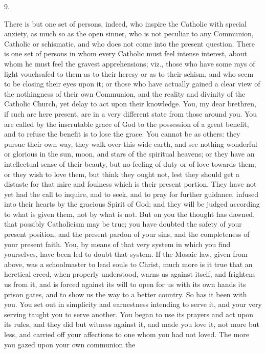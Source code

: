 9.

There is but one set of persons, indeed, who inspire the Catholic
with special anxiety, as much so as the open sinner, who is not
peculiar to any Communion, Catholic or schismatic, and who does not
come into the present question. There is one set of persons in whom
every Catholic must feel intense interest, about whom he must feel the
gravest apprehensions; viz., those who have some rays of light
vouchsafed to them as to their heresy or as to their schism, and who
seem to be closing their eyes upon it; or those who have actually
gained a clear view of the nothingness of their own Communion, and the
reality and divinity of the Catholic Church, yet delay to act upon
their knowledge. You, my dear brethren, if such are here present, are
in a very different state from those around you. You are called by the
inscrutable grace of God to the possession of a great benefit, and to
refuse the benefit is to lose the grace. You cannot be as others: they
pursue their own way, they walk over this wide earth, and see nothing
wonderful or glorious in the sun, moon, and stars of the spiritual
heavens; or they have an intellectual sense of their beauty, but no
feeling of duty or of love towards them; or they wish to love them,
but think they ought not, lest they should get a distaste for that
mire and foulness which is their present portion. They have not yet
had the call to inquire, and to seek, and to pray for further
guidance, infused into their hearts by the gracious Spirit of God; and
they will be judged according to what is given them, not by what is
not. But on you the thought has dawned, that possibly Catholicism may
be true; you have doubted the safety of your present position, and the
present pardon of your sins, and the completeness of your present
faith. You, by means of that very system in which you find yourselves,
have been led to doubt that system. If the Mosaic law, given from
above, was a schoolmaster to lead souls to Christ, much more is it
true that an heretical creed, when properly understood, warns us
against itself, and frightens us from it, and is forced against its
will to open for us with its own hands its prison gates, and to show
us the way to a better country. So has it been with you. You set out
in simplicity and earnestness intending to serve it, and your very
serving taught you to serve another. You began to use its prayers and
act upon its rules, and they did but witness against it, and made you
love it, not more but less, and carried off your affections to one
whom you had not loved. The more you gazed upon your own communion the
